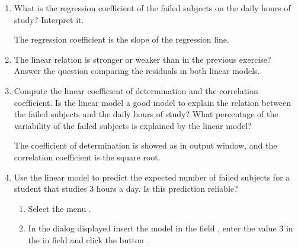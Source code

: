 \begin{enumerate}[leftmargin=*]
\begin{enumerate}
\item What is the regression coefficient of the failed subjects on the daily hours of study?
Interpret it.
\begin{indication}
The regression coefficient is the slope of the regression line. 
\end{indication}

\item The linear relation is stronger or weaker than in the previous exercise? 
Answer the question comparing the residuals in both linear models.

\item Compute the linear coefficient of determination and the correlation coefficient.
Is the linear model a good model to explain the relation between the failed subjects and the daily hours of study?
What percentage of the variability of the failed subjects is explained by the linear model? 
\begin{indication}
The coefficient of determination is showed as  in output window, and the correlation coefficient is the
square root.
\end{indication}

\item Use the linear model to predict the expected number of failed subjects for a student that studies 3 hours a day. 
Is this prediction reliable?
\begin{indication}
\begin{enumerate}
\item Select the menu .
\item In the dialog displayed insert the model  in the field
, enter the value 3 in the in field  and click the button
.
\end{enumerate}
\end{indication}


\end{enumerate}
\end{enumerate}
